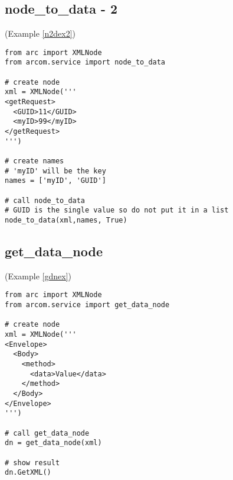 \subsection{node\_to\_data - 2}
(Example \ref{n2dex2})
\label{cn2dex2}
\begin{verbatim}
from arc import XMLNode
from arcom.service import node_to_data

# create node
xml = XMLNode('''
<getRequest>
  <GUID>11</GUID>
  <myID>99</myID>
</getRequest>
''')

# create names
# 'myID' will be the key
names = ['myID', 'GUID']

# call node_to_data
# GUID is the single value so do not put it in a list
node_to_data(xml,names, True)
\end{verbatim}

\subsection{get\_data\_node}
(Example \ref{gdnex})
\label{cgdnex}
\begin{verbatim}
from arc import XMLNode
from arcom.service import get_data_node

# create node
xml = XMLNode('''
<Envelope>
  <Body>
    <method>
      <data>Value</data>
    </method>
  </Body>
</Envelope>
''')

# call get_data_node
dn = get_data_node(xml)

# show result
dn.GetXML()
\end{verbatim}

